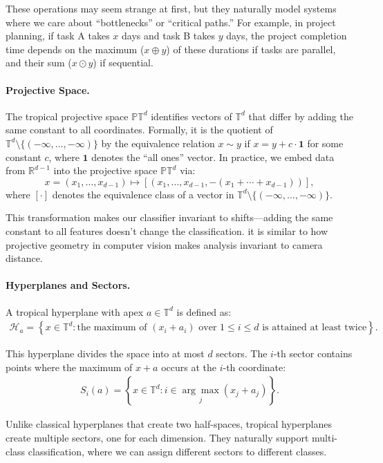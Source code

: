 \documentclass{article}
\renewcommand{\leq}{\leqslant}
\newcommand{\R}{\mathbb{R}}
\newcommand{\trop}{\mathbb{T}}
\newcommand{\proj}{\mathbb{P}}
\begin{document}
These operations may seem strange at first, but they naturally model systems where we care about ``bottlenecks'' or ``critical paths.'' For example, in project planning, if task A takes $x$ days and task B takes $y$ days, the project completion time depends on the maximum ($x \oplus y$) of these durations if tasks are parallel, and their sum ($x \odot y$) if sequential.

\paragraph{Projective Space.}  
The tropical projective space $\proj \trop^d$ identifies vectors of $\trop^d$ that differ by adding the same constant to all coordinates. Formally, it is the quotient of $\trop^d \setminus \{(-\infty,\dots,-\infty)\}$ by the equivalence relation $x \sim y$ if $x = y + c \cdot \mathbf{1}$ for some constant $c$, where $\mathbf{1}$ denotes the ``all ones'' vector. In practice, we embed data from $\R^{d-1}$ into the projective space $\proj \trop^d$ via:
\[
x=(x_1,\dots,x_{d-1})\mapsto [(x_1,\dots,x_{d-1},-(x_1+\cdots+x_{d-1}))],
\]
where $[\cdot]$ denotes the equivalence class of a vector in  $\trop^d \setminus \{(-\infty,\dots,-\infty)\}$.

This transformation makes our classifier invariant to shifts—adding the same constant to all features doesn't change the classification. it is similar to how projective geometry in computer vision makes analysis invariant to camera distance.

\paragraph{Hyperplanes and Sectors.}
A tropical hyperplane with apex $a \in \trop^d$ is defined as:
\begin{align}
\mathcal{H}_a = \left\{ x \in \trop^d : \text{the maximum of }(x_i + a_i)\text{ over $1\leq i\leq d$ is attained at least twice} \right\}.
\end{align}

This hyperplane divides the space into at most $d$ sectors. The $i$-th sector contains points where the maximum of $x + a$ occurs at the $i$-th coordinate:
\begin{align}
S_i(a) = \left\{x \in \trop^d : i \in \underset{j}{\arg\max} (x_j + a_j)\right\}.
\end{align}

Unlike classical hyperplanes that create two half-spaces, tropical hyperplanes create multiple sectors, one for each dimension. They naturally support multi-class classification, where we can assign different sectors to different classes.
\end{document}
